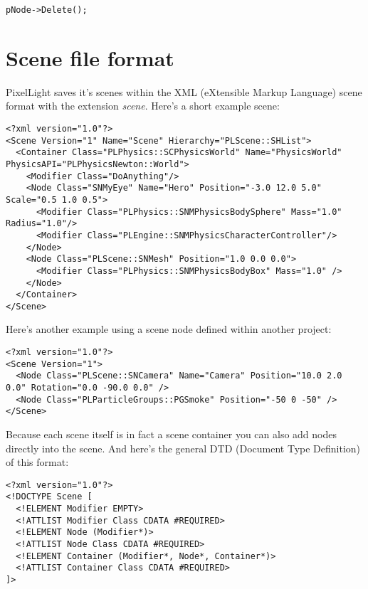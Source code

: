 \begin{lstlisting}[caption=Delete a scene node]
pNode->Delete();
\end{lstlisting}




\section{Scene file format}
PixelLight saves it's scenes within the XML (eXtensible Markup Language) scene format with the extension \emph{scene}. Here's a short example scene:

\begin{lstlisting}[caption=Scene file example]
<?xml version="1.0"?>
<Scene Version="1" Name="Scene" Hierarchy="PLScene::SHList">
  <Container Class="PLPhysics::SCPhysicsWorld" Name="PhysicsWorld" PhysicsAPI="PLPhysicsNewton::World">
    <Modifier Class="DoAnything"/>
    <Node Class="SNMyEye" Name="Hero" Position="-3.0 12.0 5.0" Scale="0.5 1.0 0.5">
      <Modifier Class="PLPhysics::SNMPhysicsBodySphere" Mass="1.0" Radius="1.0"/>
      <Modifier Class="PLEngine::SNMPhysicsCharacterController"/>
    </Node>
    <Node Class="PLScene::SNMesh" Position="1.0 0.0 0.0">
      <Modifier Class="PLPhysics::SNMPhysicsBodyBox" Mass="1.0" />
    </Node>
  </Container>
</Scene>
\end{lstlisting}

Here's another example using a scene node defined within another project:

\begin{lstlisting}[caption=Another scene file example]
<?xml version="1.0"?>
<Scene Version="1">
  <Node Class="PLScene::SNCamera" Name="Camera" Position="10.0 2.0 0.0" Rotation="0.0 -90.0 0.0" />
  <Node Class="PLParticleGroups::PGSmoke" Position="-50 0 -50" />
</Scene>
\end{lstlisting}

Because each scene itself is in fact a scene container you can also add nodes directly into the scene. And here's the general DTD (Document Type Definition) of this format:

\begin{lstlisting}[caption=Scene file format DTD]
<?xml version="1.0"?>
<!DOCTYPE Scene [
  <!ELEMENT Modifier EMPTY>
  <!ATTLIST Modifier Class CDATA #REQUIRED>
  <!ELEMENT Node (Modifier*)>
  <!ATTLIST Node Class CDATA #REQUIRED>
  <!ELEMENT Container (Modifier*, Node*, Container*)>
  <!ATTLIST Container Class CDATA #REQUIRED>
]>
\end{lstlisting}

